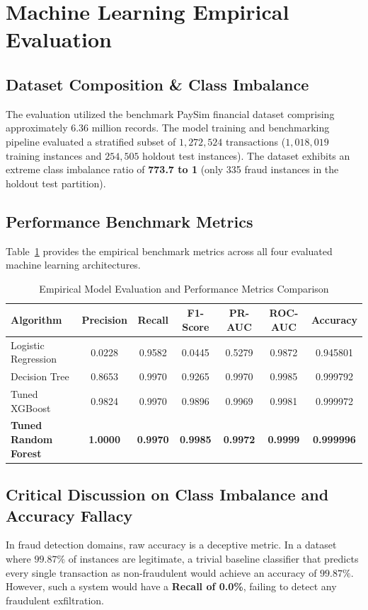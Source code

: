 \section{Machine Learning Empirical Evaluation}

\subsection{Dataset Composition \& Class Imbalance}
The evaluation utilized the benchmark PaySim financial dataset comprising approximately 6.36 million records. The model training and benchmarking pipeline evaluated a stratified subset of $1,272,524$ transactions ($1,018,019$ training instances and $254,505$ holdout test instances). The dataset exhibits an extreme class imbalance ratio of \textbf{773.7 to 1} (only 335 fraud instances in the holdout test partition).

\subsection{Performance Benchmark Metrics}
Table~\ref{tab:model_comparison_metrics} provides the empirical benchmark metrics across all four evaluated machine learning architectures.

\begin{table}[h]
\centering
\caption{Empirical Model Evaluation and Performance Metrics Comparison}
\label{tab:model_comparison_metrics}
\begin{tabularx}{\textwidth}{lcccccc}
\toprule
\textbf{Algorithm} & \textbf{Precision} & \textbf{Recall} & \textbf{F1-Score} & \textbf{PR-AUC} & \textbf{ROC-AUC} & \textbf{Accuracy} \\
\midrule
Logistic Regression & 0.0228 & 0.9582 & 0.0445 & 0.5279 & 0.9872 & 0.945801 \\
Decision Tree & 0.8653 & 0.9970 & 0.9265 & 0.9970 & 0.9985 & 0.999792 \\
Tuned XGBoost & 0.9824 & 0.9970 & 0.9896 & 0.9969 & 0.9981 & 0.999972 \\
\textbf{Tuned Random Forest} & \textbf{1.0000} & \textbf{0.9970} & \textbf{0.9985} & \textbf{0.9972} & \textbf{0.9999} & \textbf{0.999996} \\
\bottomrule
\end{tabularx}
\end{table}

\subsection{Critical Discussion on Class Imbalance and Accuracy Fallacy}
In fraud detection domains, raw accuracy is a deceptive metric. In a dataset where $99.87\%$ of instances are legitimate, a trivial baseline classifier that predicts every single transaction as non-fraudulent would achieve an accuracy of $99.87\%$. However, such a system would have a \textbf{Recall of 0.0\%}, failing to detect any fraudulent exfiltration. 

